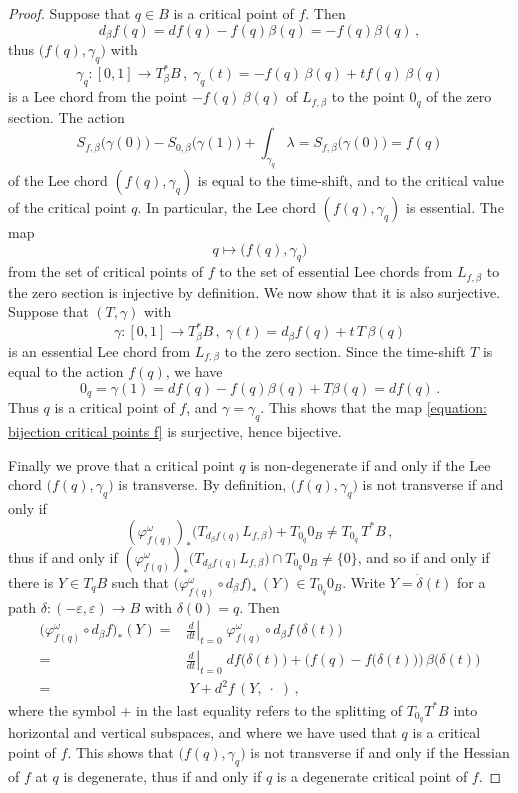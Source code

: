 \documentclass{amsart}
\theoremstyle{remark}
\begin{document}
\begin{proof}
Suppose that $q \in B$ is a critical point of $f$.
Then
\[
d_{\beta}f (q) = df(q) - f(q) \beta(q)
= -f(q) \beta(q) \,,
\]
thus $\big( f(q), \gamma_q \big)$
with
\[
\gamma_q: [0, 1] \rightarrow T_{\beta}^{\ast}B \,,\;
\gamma_q (t) = - f(q) \, \beta(q) + t f(q) \, \beta(q)
\]
is a Lee chord from the point
$- f(q) \, \beta(q)$ of $L_{f, \beta}$
to the point $0_q$ of the zero section.
The action
\[
S_{f, \beta} \big(\gamma(0)\big)
- S_{0, \beta}\big(\gamma(1)\big) + \int_{\gamma_q} \lambda 
= S_{f, \beta} \big(\gamma(0)\big) = f(q)
\]
of the Lee chord $(f(q),\gamma_q)$
is equal to the time-shift,
and to the critical value
of the critical point $q$.
In particular,
the Lee chord $(f(q),\gamma_q)$ is essential.
The map
\begin{equation}\label{equation: bijection critical points f}
q \mapsto \big(f(q),\gamma_q\big)    
\end{equation}
from the set of critical points of $f$
to the set of essential Lee chords
from $L_{f, \beta}$ to the zero section
is injective by definition.
We now show that it is also surjective.
Suppose that $(T, \gamma)$ with
\[
\gamma: [0, 1] \rightarrow T_{\beta}^{\ast}B \,,\;
\gamma (t) = d_{\beta}f (q) + t \, T \, \beta(q)
\]
is an essential Lee chord from $L_{f, \beta}$ to the zero section.
Since the time-shift $T$ is equal to the action $f(q)$,
we have
$$
0_q = \gamma(1) = df(q) - f(q)\beta(q) + T\beta(q) = df(q) \,.
$$ 
Thus $q$ is a critical point of $f$,
and $\gamma = \gamma_q$.
This shows that the map
\eqref{equation: bijection critical points f}
is surjective,
hence bijective.

Finally we prove that a critical point $q$ is non-degenerate
if and only if the Lee chord
$\big(f(q),\gamma_q\big)$
is transverse.
By definition,
$\big(f(q),\gamma_q\big)$ is not transverse
if and only if
\[
(\varphi_{f(q)}^{\omega})_{\ast} \big(T_{d_{\beta}f(q)} L_{f, \beta} \big)
+ T_{0_q} 0_B \neq
T_{0_q} \, T^{\ast}B \,,
\]
thus if and only if
$(\varphi_{f(q)}^{\omega})_{\ast} \big(T_{d_{\beta}f(q)} L_{f, \beta} \big)
\cap T_{0_q} 0_B \neq \{0\}$,
and so if and only if there is $Y \in T_qB$ such that
$\big(\varphi_{f(q)}^{\omega} \circ d_{\beta}f\big)_{\ast} \, (Y) \in T_{0_q}0_B$.
Write $Y = \dot{\delta}(t)$
for a path $\delta: (-\varepsilon, \varepsilon) \to B$
with $\delta (0) = q$.
Then
\begin{align*}
\big(\varphi^\omega_{f(q)} \circ d_\beta f\big)_*(Y) = &
\left. \frac{d}{dt} \right\lvert_{t=0} \;
\varphi^\omega_{f(q)} \circ d_\beta f \, \big(\delta(t)\big) \\
= & \left. \frac{d}{dt} \right\lvert_{t=0} \;
df \big(\delta(t)\big) + \Big( f(q) - f \big(\delta(t)\big) \Big) \, \beta \big(\delta(t)\big) \\
= & \; Y + d^2f \, (Y, \;\cdot\;) \,,
\end{align*}
where the symbol $+$ in the last equality
refers to the splitting of $T_{0_q}T^*B$
into horizontal and vertical subspaces,
and where we have used that $q$ is a critical point of $f$.
This shows that $\big(f(q),\gamma_q\big)$ is not transverse
if and only if the Hessian of $f$ at $q$ is degenerate,
thus if and only if $q$ is a degenerate critical point of $f$.
\end{proof}
\end{document}
